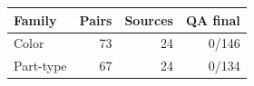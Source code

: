 \begin{tabular}{@{}lrrr@{}}
\toprule
Family & Pairs & Sources & QA final\\
\midrule
Color & 73 & 24 & 0/146\\
Part-type & 67 & 24 & 0/134\\
\bottomrule
\end{tabular}
